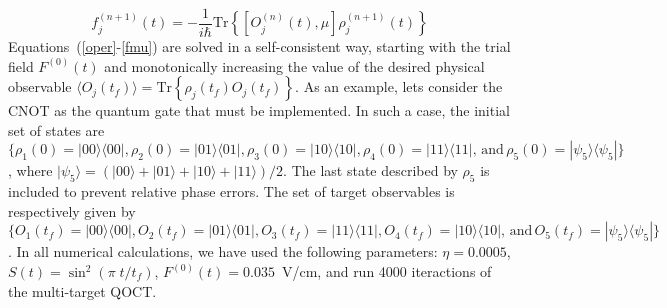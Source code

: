 \documentclass[prb,twocolumn,showpacs,floats]{revtex4}
\begin{document}
\begin{equation}
f^{(n+1)}_{j}(t) = -\frac{1}{i\hbar}\textrm{Tr}\left\{ \left[ O_j^{(n)}(t), \mu\right]\rho_j^{(n+1)}(t) \right\}\label{fmu}
\end{equation}
Equations~(\ref{oper}-\ref{fmu}) are solved in a self-consistent way, starting with the trial field $F^{(0)}(t)$ and monotonically increasing the value of the desired physical observable $\langle O_j(t_f)\rangle=\textrm{Tr}\left\{\rho_j(t_f)O_j(t_f)\right\}$. As an example, lets consider the CNOT as the quantum gate that must be implemented. In such a case, the initial set of states are  $\{\rho_1(0)=|00\rangle\langle00|,\rho_2(0)=|01\rangle\langle01|,\rho_3(0)=|10\rangle\langle10|,\rho_4(0)=|11\rangle\langle11|, \,\textrm{and}\, \rho_5(0)=|\psi_5\rangle\langle\psi_5|\}$, where $|\psi_5\rangle=\left(|00\rangle+|01\rangle+|10\rangle+|11\rangle\right)/2$. The last state described by $\rho_5$ is included to prevent relative phase errors. The set of target observables is respectively given by $\{O_1(t_f)=|00\rangle\langle00|,O_2(t_f)=|01\rangle\langle01|,O_3(t_f)=|11\rangle\langle11|,O_4(t_f)=|10\rangle\langle10|, \,\textrm{and}\, O_5(t_f)=|\psi_5\rangle\langle\psi_5|\}$. In all numerical calculations, we have used the following parameters: $\eta=0.0005$, $S(t)=\sin^2{\left(\pi\;t/t_f\right)}$, $F^{(0)}(t)=0.035$~V/cm, and run 4000 iteractions of the multi-target QOCT.
\end{document}
